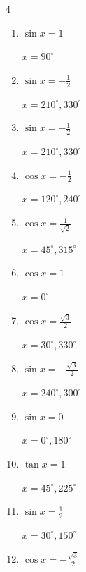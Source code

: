 \begin{multicols}{4}
\begin{enumerate}
        $\displaystyle x = 150^{\circ} , 330^{\circ}$

  \item $\displaystyle \sin{x}  = 1$

        $\displaystyle x = 90^{\circ}$

  \item $\displaystyle \sin{x}  = -\frac{1}{2}$

        $\displaystyle x = 210^{\circ} , 330^{\circ}$

  \item $\displaystyle \sin{x}  = -\frac{1}{2}$

        $\displaystyle x = 210^{\circ} , 330^{\circ}$

  \item $\displaystyle \cos{x}  = -\frac{1}{2}$

        $\displaystyle x = 120^{\circ} , 240^{\circ}$

  \item $\displaystyle \cos{x}  = \frac{1}{\sqrt{2}}$

        $\displaystyle x = 45^{\circ} , 315^{\circ}$

  \item $\displaystyle \cos{x}  = 1$

        $\displaystyle x = 0^{\circ}$

  \item $\displaystyle \cos{x}  = \frac{\sqrt{3}}{2}$

        $\displaystyle x = 30^{\circ} , 330^{\circ}$

  \item $\displaystyle \sin{x}  = -\frac{\sqrt{3}}{2}$

        $\displaystyle x = 240^{\circ} , 300^{\circ}$

\columnbreak %

  \item $\displaystyle \sin{x}  = 0$

        $\displaystyle x = 0^{\circ} , 180^{\circ}$

  \item $\displaystyle \tan{x}  = 1$

        $\displaystyle x = 45^{\circ} , 225^{\circ}$

  \item $\displaystyle \sin{x}  = \frac{1}{2}$

        $\displaystyle x = 30^{\circ} , 150^{\circ}$

  \item $\displaystyle \cos{x}  = -\frac{\sqrt{3}}{2}$


\end{enumerate}
\end{multicols}
